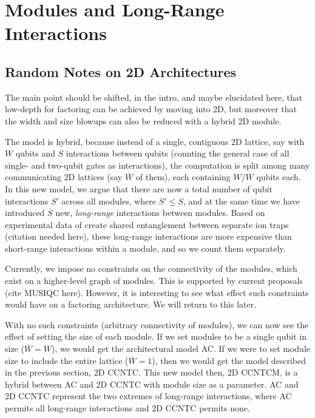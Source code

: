 \section{Modules and Long-Range Interactions}
\label{sec:intro-modules}

\subsection{Random Notes on 2D Architectures}

The main point should be shifted, in the intro, and maybe elucidated here,
that low-depth for factoring can be achieved by moving into 2D, but
moreover that the width and size blowups can also be reduced with a
hybrid 2D module.

The model is hybrid, because instead of a single, contiguous 2D lattice,
say with $W$ qubits and $S$ interactions between qubits (counting the
general case of all single- and two-qubit gates as interactions),
the computation is split among many communicating 2D lattices
(say $\overline{W}$ of them), each containing $W/\overline{W}$ qubits
each. In this new model, we argue that there are now a total number of
qubit interactions $S'$ across all modules, where $S' \le S$, and at
the same time we have introduced $\overline{S}$
new, \emph{long-range} interactions between modules. Based on experimental
data of create shared entanglement between separate ion traps (citation needed here),
these long-range interactions are more expensive than short-range interactions
within a module, and so we count them separately.

Currently, we impose no constraints on the connectivity of the modules, which exist
on a higher-level graph of modules. This is supported by current proposals
(cite MUSIQC here). However, it is interesting to see what effect such constraints
would have on a factoring architecture. We will return to this later.

With no such constraints (arbitrary connectivity of modules), we can now see the
effect of setting the size of each module. If we set modules
to be a single qubit in size ($\overline{W} = W$), we would get the architectural
model \textsf{AC}. If we were to set module size to include the entire lattice
($\overline{W} = 1$), then we would get the model described in the previous
section, \textsf{2D CCNTC}. This new model then, \textsf{2D CCNTCM}, is a hybrid
between \textsf{AC} and \textsf{2D CCNTC} with module size as a parameter.
\textsf{AC} and \textsf{2D CCNTC} represent the two extremes of long-range
interactions, where \textsf{AC} permits all long-range interactions and
\textsf{2D CCNTC} permits none.

